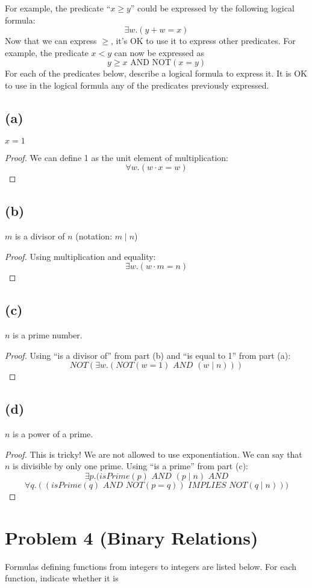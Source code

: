 \documentclass[14pt]{extarticle}
\begin{document}
For example, the predicate ``$x \geq y$'' could be expressed by the following logical formula:
$$
\exists w.(y + w = x)
$$
Now that we can express $\geq$, it’s OK to use it to express other predicates. For example, the predicate $x < y$ can now be expressed as
$$
y \geq x \text{ AND NOT}(x = y)
$$
For each of the predicates below, describe a logical formula to express it. It is OK to use in the logical formula any of the predicates previously expressed.
\subsection{(a)}
$x = 1$
\begin{proof}
We can define 1 as the unit element of multiplication:
$$
\forall w.(w \cdot x = w)
$$
\end{proof}

\subsection{(b)}
$m$ is a divisor of $n$ (notation: $m \mid n$)
\begin{proof}
Using multiplication and equality:
$$
\exists w.(w \cdot m = n)
$$
\end{proof}

\subsection{(c)}
$n$ is a prime number.
\begin{proof}
Using ``is a divisor of'' from part (b) and ``is equal to 1'' from part (a):
$$
NOT(\exists w.(NOT(w = 1)\,\, AND \,\, (w \mid n)))
$$
\end{proof}

\subsection{(d)}
$n$ is a power of a prime.
\begin{proof}
This is tricky! We are not allowed to use exponentiation. We can say that $n$ is divisible by only one prime. Using ``is a prime'' from part (c):
$$
\exists p.(isPrime(p) \,\, AND \,\,(p \mid n) \,\, AND
$$
$$
\forall q.((isPrime(q) \,\, AND \,\, NOT(p = q)) \,\, IMPLIES \,\, NOT(q \mid n)))
$$
\end{proof}

\section{Problem 4 (Binary Relations)}
Formulas defining functions from integers to integers are listed below. For each function, indicate whether it is
\end{document}
